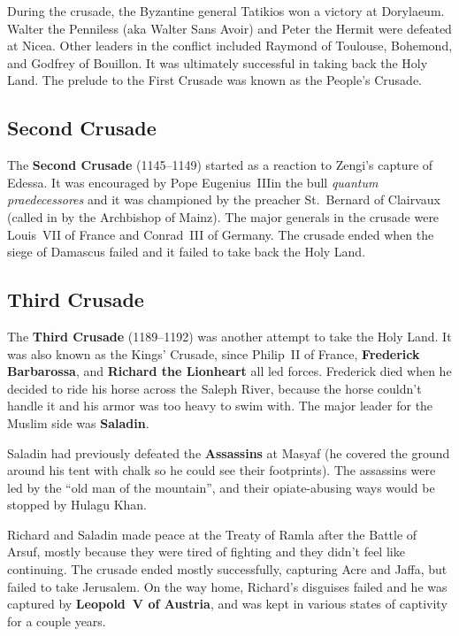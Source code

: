 During the crusade, the Byzantine general Tatikios won a victory at Dorylaeum.
Walter the Penniless (aka Walter Sans Avoir) and Peter the Hermit were defeated at Nicea.
Other leaders in the conflict included Raymond of Toulouse, Bohemond, and Godfrey of Bouillon.
It was ultimately successful in taking back the Holy Land.
The prelude to the First Crusade was known as the People's Crusade.

\subsection*{Second Crusade}

The \textbf{Second Crusade} (1145--1149) started as a reaction to Zengi's capture of Edessa.
It was encouraged by Pope Eugenius~III\@ in the bull \textit{quantum praedecessores}
and it was championed by the preacher St.\ Bernard of Clairvaux
(called in by the Archbishop of Mainz).
The major generals in the crusade were Louis~VII of France and Conrad~III of Germany.
The crusade ended when the siege of Damascus failed and it failed to take back the Holy Land.

\subsection*{Third Crusade}

The \textbf{Third Crusade} (1189--1192) was another attempt to take the Holy Land.
It was also known as the Kings' Crusade,
since Philip~II of France, \textbf{Frederick Barbarossa},
and \textbf{Richard the Lionheart} all led forces.
Frederick died when he decided to ride his horse across the Saleph River,
because the horse couldn't handle it and his armor was too heavy to swim with.
The major leader for the Muslim side was \textbf{Saladin}.

Saladin had previously defeated the \textbf{Assassins} at Masyaf
(he covered the ground around his tent with chalk so he could see their footprints).
The assassins were led by the ``old man of the mountain'',
and their opiate-abusing ways would be stopped by Hulagu Khan.

Richard and Saladin made peace at the Treaty of Ramla after the Battle of Arsuf,
mostly because they were tired of fighting and they didn't feel like continuing.
The crusade ended mostly successfully, capturing Acre and Jaffa, but failed to take Jerusalem.
On the way home, Richard's disguises failed and he was captured by \textbf{Leopold~V of Austria},
and was kept in various states of captivity for a couple years.

